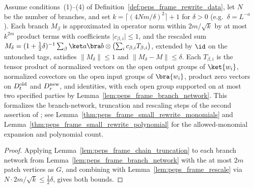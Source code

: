 \begin{lemma}
    \label{thm:peps_frame_small_rewrite_product_terms}
    \leanok
    Assume conditions~(1)--(4) of Definition~\ref{def:peps_frame_rewrite_data}, let $N$ be the number of branches, and set
    $k=\lceil(4Nm/\delta)^2\rceil+1$ for $\delta>0$ (e.g.\ $\delta=L^{-a}$). Each branch $M_\beta$ is approximated in operator norm within
    $2m/\sqrt k$ by at most $k^{2m}$ product terms with coefficients $\lvert c_{\beta,i}\rvert\le1$, and the rescaled sum
    $M_\delta=(1+\tfrac12\delta)^{-1}\sum_\beta\ket a\bra b\otimes
        \bigl(\sum_ic_{\beta,i}T_{\beta,i}\bigr)$, extended by $\id$ on
    the untouched tags, satisfies $\lVert M_\delta\rVert\le1$ and $\lVert M_\delta-M\rVert\le
        \delta$. Each $T_{\beta,i}$ is the tensor product of
    normalized vectors on the open output groups of $\ket{w_i}$, normalized
    covectors on the open input groups of $\bra{w_i}$, product zero
    vectors on $D^{\rm old}_t$ and $D^{\rm new}_r$, and identities, with each open group supported on at most
    two specified parties by Lemma~\ref{lem:peps_frame_branch_network}. This formalizes the branch-network,
    truncation and rescaling steps of the second assertion of
    \cite[Lemma~6.3]{OpenAI2026PolynomialPEPS}; see
    Lemma~\ref{thm:peps_frame_small_rewrite_monomials} and
    Lemma~\ref{thm:peps_frame_small_rewrite_polynomial} for the allowed-monomial expansion and polynomial count.
\end{lemma}

\begin{proof}\leanok
    Applying Lemma~\ref{lem:peps_frame_chain_truncation} to each branch network from Lemma~\ref{lem:peps_frame_branch_network} with the at most $2m$ patch vertices as $G$, and combining with Lemma~\ref{lem:peps_frame_rescale} via
    $N\cdot 2m/\sqrt k\le\tfrac12\delta$, gives both bounds.
\end{proof}

